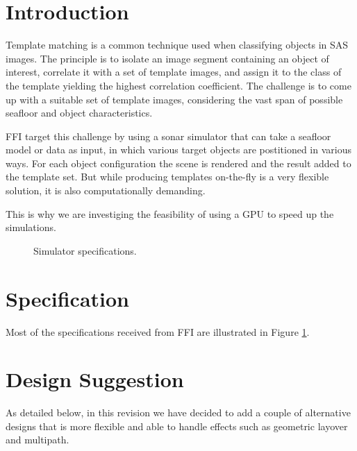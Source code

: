 \documentclass[
   article                                      %
 , 12pt                                         %
 , xelatex                                      %
 , bibtex                                       %
 , layout
]{common/mytemplate}
\begin{document}
\clearpage
\pagestyle{fancy}


\section{Introduction}

Template matching is a common technique used when classifying objects in SAS images. The principle is to isolate an image segment containing an object of interest, correlate it with a set of template images, and assign it to the class of the template yielding the highest correlation coefficient. The challenge is to come up with a suitable set of template images, considering the vast span of possible seafloor and object characteristics.

FFI target this challenge by using a sonar simulator that can take a seafloor model or data as input, in which various target objects are postitioned in various ways. For each object configuration the scene is rendered and the result added to the template set. But while producing templates on-the-fly is a very flexible solution, it is also computationally demanding.

This is why we are investiging the feasibility of using a GPU to speed up the simulations.

\begin{figure}[b]
\caption{Simulator specifications.}\label{specs}
\end{figure}

\section{Specification}

Most of the specifications received from FFI are illustrated in Figure \ref{specs}. 


\section{Design Suggestion}

As detailed below, in this revision we have decided to add a couple of alternative designs that is more flexible and able to handle effects such as geometric layover and multipath.
\end{document}
